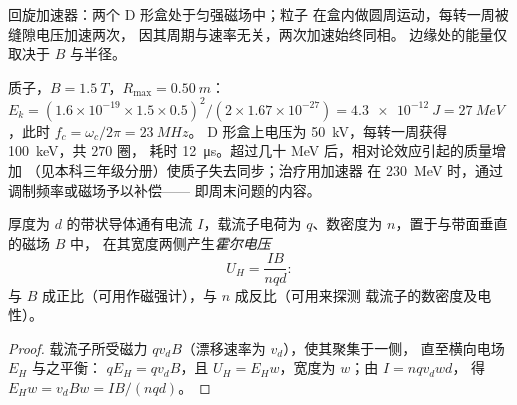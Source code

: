 \begin{omfigure}

{\small 回旋加速器：两个 D 形盒处于匀强磁场中；粒子
在盒内做圆周运动，每转一周被缝隙电压加速两次，
因其周期与速率无关，两次加速始终同相。
边缘处的能量仅取决于 $B$ 与半径。}
\end{omfigure}

\begin{example}[医院用回旋加速器]\label{ex:b1:charged-particles:medical}
质子，$B = \qty{1.5}{T}$，$R_{\max} = \qty{0.50}{m}$：$E_k =
(1.6\times10^{-19} \times 1.5 \times 0.5)^2/(2 \times 1.67\times10^{-27}) =
\qty{4.3e-12}{J} = \qty{27}{MeV}$，此时 $f_c = \omega_c/2\pi = \qty{23}{MHz}$。
D 形盒上电压为 \qty{50}{kV}，每转一周获得 \qty{100}{keV}，共 $270$ 圈，
耗时 \qty{12}{\micro s}。超过几十 MeV 后，相对论效应引起的质量增加
（见本科三年级分册）使质子失去同步；治疗用加速器
在 \qty{230}{MeV} 时，通过调制频率或磁场予以补偿——
即周末问题的内容。
\end{example}

\begin{proposition}[霍尔效应]\label{prop:b1:charged-particles:hall}
厚度为 $d$ 的带状导体通有电流 $I$，载流子电荷为
$q$、数密度为 $n$，置于与带面垂直的磁场 $B$ 中，
在其宽度两侧产生\emph{霍尔电压}
\[
U_H = \frac{IB}{nqd} :
\]
与 $B$ 成正比（可用作磁强计），与 $n$ 成反比（可用来探测
载流子的数密度及电性）。
\end{proposition}

\begin{proof}
载流子所受磁力 $qv_dB$（漂移速率为 $v_d$），使其聚集于一侧，
直至横向电场 $E_H$ 与之平衡：
$qE_H = qv_dB$，且 $U_H = E_Hw$，宽度为 $w$；由 $I = nqv_dwd$，
得 $E_Hw = v_dBw = IB/(nqd)$。
\end{proof}

